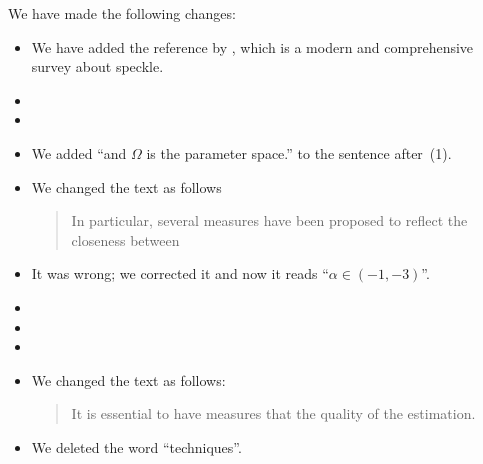 \documentclass{ar2rc}
\begin{document}
\AR We have made the following changes:
\begin{itemize}
\item We have added the reference by \citet{SARImageStatisticalModelingPartISinglePixelStatisticalModels}, which is a modern and comprehensive survey about speckle.
\item 
\item 
\item We added ``and $\Omega$ is the parameter space.'' to the sentence after~(1).
\item We changed the text as follows
		\begin{quote}
	In particular, several measures have been proposed to reflect the closeness between \DIFdelbegin {} \DIFdelend \DIFaddbegin {}\DIFaddend
		\end{quote}
\item It was wrong; we corrected it and now it reads ``$\alpha \in (-1,-3)$''.
\item 
\item 
\item 
\item We changed the text as follows:
	\begin{quote}		
	It is essential to have measures that \DIFdelbegin {} \DIFdelend \DIFaddbegin {}\DIFaddend the quality of the estimation. 
	\end{quote}
\item We deleted the word ``techniques''.
\end{itemize}



	
\end{document}
